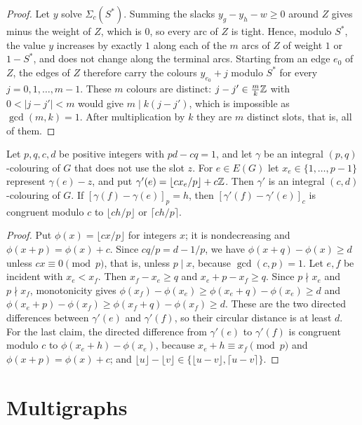 \documentclass[11pt,colorlinks]{charlie}
\newcommand{\dir}[2]{[#2-#1]}
\begin{document}
\begin{proof}
Let $y$ solve $\Sigma_c(S^*)$. Summing the slacks $y_g-y_h-w\ge0$ around $Z$ gives minus the weight of $Z$, which is $0$, so every arc of $Z$ is tight. Hence, modulo $S^*$, the value $y$ increases by exactly $1$ along each of the $m$ arcs of $Z$ of weight $1$ or $1-S^*$, and does not change along the terminal arcs. Starting from an edge $e_0$ of $Z$, the edges of $Z$ therefore carry the colours $y_{e_0}+j$ modulo $S^*$ for every $j=0,1,\dots,m-1$. These $m$ colours are distinct: $j-j'\in\frac mk\mathbb{Z}$ with $0<|j-j'|<m$ would give $m\mid k(j-j')$, which is impossible as $\gcd(m,k)=1$. After multiplication by $k$ they are $m$ distinct slots, that is, all of them.
\end{proof}

\begin{lemma}[Projection]\label{lem:projection}
Let $p,q,c,d$ be positive integers with $pd-cq=1$, and let $\gamma$ be an integral $(p,q)$-colouring of $G$ that does not use the slot $z$. For $e\in E(G)$ let $x_e\in\{1,\dots,p-1\}$ represent $\gamma(e)-z$, and put $\gamma'(e)=\lfloor cx_e/p\rfloor+c\mathbb{Z}$. Then $\gamma'$ is an integral $(c,d)$-colouring of $G$. If $\dir{\gamma(e)}{\gamma(f)}_p=h$, then $\dir{\gamma'(e)}{\gamma'(f)}_c$ is congruent modulo $c$ to $\lfloor ch/p\rfloor$ or $\lceil ch/p\rceil$.
\end{lemma}

\begin{proof}
Put $\phi(x)=\lfloor cx/p\rfloor$ for integers $x$; it is nondecreasing and $\phi(x+p)=\phi(x)+c$. Since $cq/p=d-1/p$, we have $\phi(x+q)-\phi(x)\ge d$ unless $cx\equiv0\pmod p$, that is, unless $p\mid x$, because $\gcd(c,p)=1$. Let $e,f$ be incident with $x_e<x_f$. Then $x_f-x_e\ge q$ and $x_e+p-x_f\ge q$. Since $p\nmid x_e$ and $p\nmid x_f$, monotonicity gives $\phi(x_f)-\phi(x_e)\ge\phi(x_e+q)-\phi(x_e)\ge d$ and $\phi(x_e+p)-\phi(x_f)\ge\phi(x_f+q)-\phi(x_f)\ge d$. These are the two directed differences between $\gamma'(e)$ and $\gamma'(f)$, so their circular distance is at least $d$. For the last claim, the directed difference from $\gamma'(e)$ to $\gamma'(f)$ is congruent modulo $c$ to $\phi(x_e+h)-\phi(x_e)$, because $x_e+h\equiv x_f\pmod p$ and $\phi(x+p)=\phi(x)+c$; and $\lfloor u\rfloor-\lfloor v\rfloor\in\{\lfloor u-v\rfloor,\lceil u-v\rceil\}$.
\end{proof}

\section{Multigraphs}\label{sec:multi}
\end{document}
